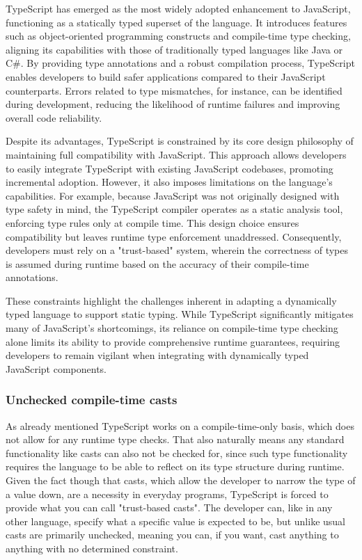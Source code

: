 TypeScript has emerged as the most widely adopted enhancement to JavaScript, functioning as a statically typed superset of the language. It introduces features such as object-oriented programming constructs and compile-time type checking, aligning its capabilities with those of traditionally typed languages like Java or C\#. By providing type annotations and a robust compilation process, TypeScript enables developers to build safer applications compared to their JavaScript counterparts. Errors related to type mismatches, for instance, can be identified during development, reducing the likelihood of runtime failures and improving overall code reliability.

Despite its advantages, TypeScript is constrained by its core design philosophy of maintaining full compatibility with JavaScript. This approach allows developers to easily integrate TypeScript with existing JavaScript codebases, promoting incremental adoption. However, it also imposes limitations on the language’s capabilities. For example, because JavaScript was not originally designed with type safety in mind, the TypeScript compiler operates as a static analysis tool, enforcing type rules only at compile time. This design choice ensures compatibility but leaves runtime type enforcement unaddressed. Consequently, developers must rely on a "trust-based" system, wherein the correctness of types is assumed during runtime based on the accuracy of their compile-time annotations.

These constraints highlight the challenges inherent in adapting a dynamically typed language to support static typing. While TypeScript significantly mitigates many of JavaScript’s shortcomings, its reliance on compile-time type checking alone limits its ability to provide comprehensive runtime guarantees, requiring developers to remain vigilant when integrating with dynamically typed JavaScript components.

\subsubsection{Unchecked compile-time casts}

As already mentioned TypeScript works on a compile-time-only basis, which does not allow for any runtime type checks. That also naturally means any standard functionality like casts can also not be checked for, since such type functionality requires the language to be able to reflect on its type structure during runtime. Given the fact though that casts, which allow the developer to narrow the type of a value down, are a necessity in everyday programs, TypeScript is forced to provide what you can call "trust-based casts". The developer can, like in any other language, specify what a specific value is expected to be, but unlike usual casts are primarily unchecked, meaning you can, if you want, cast anything to anything with no determined constraint.

